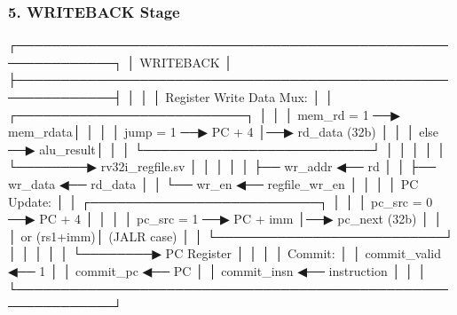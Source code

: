 \subsubsection{5. WRITEBACK Stage}\label{cr:fix:cpu-dataflow-diagram:5-writeback-stage}

\begin{record}

\begin{textblock}
┌─────────────────────────────────────────────────────────────┐
│                    WRITEBACK                                │
├─────────────────────────────────────────────────────────────┤
│                                                             │
│  Register Write Data Mux:                                   │
│  ┌──────────────────────────┐                               │
│  │ mem_rd = 1  ──▶ mem_rdata│                               │
│  │ jump = 1    ──▶ PC + 4   │──▶ rd_data (32b)             │
│  │ else        ──▶ alu_result│                              │
│  └──────────────────────────┘                               │
│         │                                                   │
│         └────────▶ rv32i_regfile.sv                         │
│                         │                                   │
│                         ├── wr_addr ◀── rd                  │
│                         ├── wr_data ◀── rd_data             │
│                         └── wr_en ◀── regfile_wr_en         │
│                                                             │
│  PC Update:                                                 │
│  ┌──────────────────────────┐                               │
│  │ pc_src = 0  ──▶ PC + 4   │                               │
│  │ pc_src = 1  ──▶ PC + imm │──▶ pc_next (32b)             │
│  │              or (rs1+imm)│      (JALR case)              │
│  └──────────────────────────┘                               │
│         │                                                   │
│         └────────▶ PC Register                              │
│                                                             │
│  Commit:                                                    │
│  commit_valid ◀── 1                                         │
│  commit_pc ◀── PC                                           │
│  commit_insn ◀── instruction                                │
│                                                             │
└─────────────────────────────────────────────────────────────┘
\end{textblock}

\end{record}

